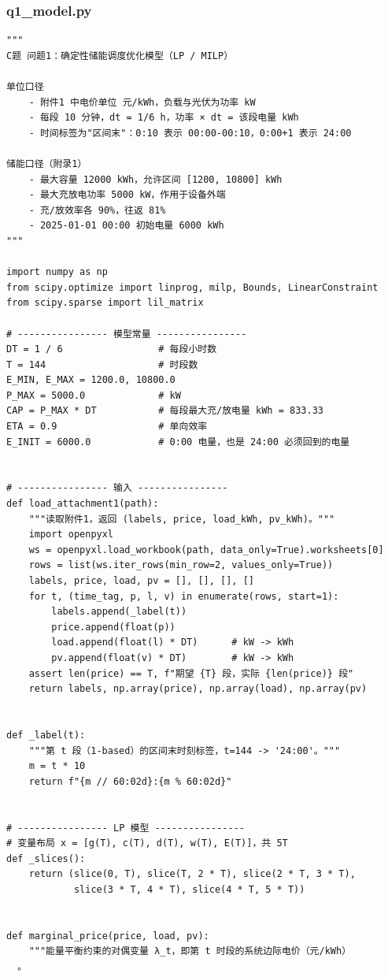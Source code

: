 \subsubsection*{q1\_model.py}
\begin{verbatim}
"""
C题 问题1：确定性储能调度优化模型（LP / MILP）

单位口径
    - 附件1 中电价单位 元/kWh，负载与光伏为功率 kW
    - 每段 10 分钟，dt = 1/6 h，功率 × dt = 该段电量 kWh
    - 时间标签为"区间末"：0:10 表示 00:00-00:10，0:00+1 表示 24:00

储能口径（附录1）
    - 最大容量 12000 kWh，允许区间 [1200, 10800] kWh
    - 最大充放电功率 5000 kW，作用于设备外端
    - 充/放效率各 90%，往返 81%
    - 2025-01-01 00:00 初始电量 6000 kWh
"""

import numpy as np
from scipy.optimize import linprog, milp, Bounds, LinearConstraint
from scipy.sparse import lil_matrix

# ---------------- 模型常量 ----------------
DT = 1 / 6                 # 每段小时数
T = 144                    # 时段数
E_MIN, E_MAX = 1200.0, 10800.0
P_MAX = 5000.0             # kW
CAP = P_MAX * DT           # 每段最大充/放电量 kWh = 833.33
ETA = 0.9                  # 单向效率
E_INIT = 6000.0            # 0:00 电量，也是 24:00 必须回到的电量


# ---------------- 输入 ----------------
def load_attachment1(path):
    """读取附件1，返回 (labels, price, load_kWh, pv_kWh)。"""
    import openpyxl
    ws = openpyxl.load_workbook(path, data_only=True).worksheets[0]
    rows = list(ws.iter_rows(min_row=2, values_only=True))
    labels, price, load, pv = [], [], [], []
    for t, (time_tag, p, l, v) in enumerate(rows, start=1):
        labels.append(_label(t))
        price.append(float(p))
        load.append(float(l) * DT)      # kW -> kWh
        pv.append(float(v) * DT)        # kW -> kWh
    assert len(price) == T, f"期望 {T} 段，实际 {len(price)} 段"
    return labels, np.array(price), np.array(load), np.array(pv)


def _label(t):
    """第 t 段（1-based）的区间末时刻标签，t=144 -> '24:00'。"""
    m = t * 10
    return f"{m // 60:02d}:{m % 60:02d}"


# ---------------- LP 模型 ----------------
# 变量布局 x = [g(T), c(T), d(T), w(T), E(T)]，共 5T
def _slices():
    return (slice(0, T), slice(T, 2 * T), slice(2 * T, 3 * T),
            slice(3 * T, 4 * T), slice(4 * T, 5 * T))


def marginal_price(price, load, pv):
    """能量平衡约束的对偶变量 λ_t，即第 t 时段的系统边际电价（元/kWh）
  。


\end{verbatim}
